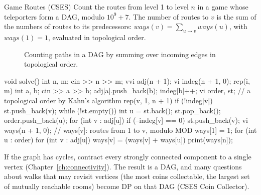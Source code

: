 \begin{problem}{Game Routes (CSES)}
Count the routes from level 1 to level $n$ in a game whose teleporters form a DAG, modulo $10^9 + 7$.
\solution The number of routes to $v$ is the sum of the numbers of routes to its predecessors: $\mathit{ways}(v) =
\sum_{u \to v} \mathit{ways}(u)$, with $\mathit{ways}(1) = 1$, evaluated in topological order.
\end{problem}

\begin{figure}[htbp]
\centering
{}
\caption{Counting paths in a DAG by summing over incoming edges in topological order.}
\label{fig:gameroutes}
\end{figure}

\begin{code}
void solve() {
    int n, m;
    cin >> n >> m;
    vvi adj(n + 1);
    vi indeg(n + 1, 0);
    rep(i, m) {
        int a, b;
        cin >> a >> b;
        adj[a].push_back(b);
        indeg[b]++;
    }
    vi order, st;  // a topological order by Kahn's algorithm
    rep(v, 1, n + 1) if (!indeg[v]) st.push_back(v);
    while (!st.empty()) {
        int u = st.back();
        st.pop_back();
        order.push_back(u);
        for (int v : adj[u])
            if (--indeg[v] == 0) st.push_back(v);
    }
    vi ways(n + 1, 0);  // ways[v]: routes from 1 to v, modulo MOD
    ways[1] = 1;
    for (int u : order)
        for (int v : adj[u]) ways[v] = (ways[v] + ways[u]) %
    print(ways[n]);
}
\end{code}

\begin{trick}
If the graph has cycles, contract every strongly connected component to a single vertex (Chapter~\ref{ch:connectivity}). The
result is a DAG, and many questions about walks that may revisit vertices (the most coins collectable, the largest set of
mutually reachable rooms) become DP on that DAG (CSES Coin Collector).
\end{trick}

